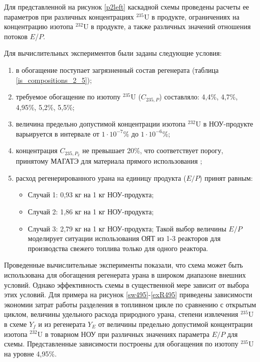 Для представленной на рисунок \ref{p2left} каскадной схемы проведены расчеты ее параметров при различных концентрациях $^{235}$U в продукте, ограничениях на концентрацию изотопа $^{232}$U в продукте, а также различных значений отношения потоков $E$/$P$.

Для вычислительных экспериментов были заданы следующие условия:

\begin{enumerate}
    \item в обогащение поступает загрязненный состав регенерата (таблица \ref{is_compositions_2_5}); 
    \item требуемое обогащение по изотопу $^{235}$U ($C_{235,P}$) составляло: 4,4\%, 4,7\%, 4,95\%, 5,2\%, 5,5\%;    
    \item величина предельно допустимой концентрации изотопа $^{232}$U в НОУ-продукте варьируется в интервале от $1\cdot10^{-7}$\% до $1\cdot10^{-6}$\%;
    \item концентрация $C_{235,{P_2}}$ не превышает 20\%, что соответствует порогу, принятому МАГАТЭ для материала прямого использования \cite{alekseevConceptUseRecycled2010};
    \item расход регенерированного урана на единицу продукта ($E/P$) принят равным:
    \begin{itemize}
        \item Случай 1: 0,93 кг на 1 кг НОУ-продукта;
        \item Случай 2: 1,86 кг на 1 кг НОУ-продукта;
        \item Случай 3: 2,79 кг на 1 кг НОУ-продукта;        
        Такой выбор величины $E/P$ моделирует ситуации использования ОЯТ из 1-3 реакторов для производства свежего топлива только для одного реактора.
    \end{itemize}
\end{enumerate}

Проведенные вычислительные эксперименты показали, что схема может быть использована для обогащения регенерата урана в широком диапазоне внешних условий. Однако эффективность схемы в существенной мере зависит от выбора этих условий. Для примера на рисунок \ref{sw495}-\ref{exR495} приведены зависимости экономии затрат работы разделения в топливном цикле по сравнению с открытым циклом, величины удельного расхода природного урана, степени извлечения $^{235}$U в схеме $Y_f$ и из регенерата $Y_{E}$ от величины предельно допустимой концентрации изотопа $^{232}$U в товарном НОУ при различных значениях параметра $E/P$ для схемы. Представленные зависимости построены для обогащения по изотопу $^{235}$U на уровне 4,95\%.

